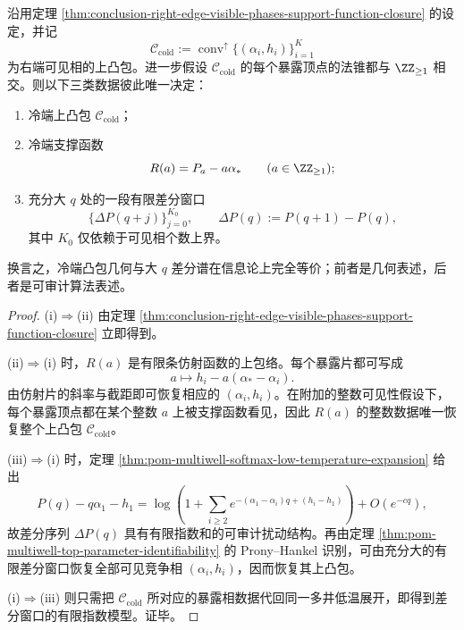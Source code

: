 \begin{theorem}\label{thm:conclusion-coldend-convex-hull-difference-window-prony-equivalence}
沿用定理 \ref{thm:conclusion-right-edge-visible-phases-support-function-closure} 的设定，并记
\[
\mathcal C_{\mathrm{cold}}
:=
\operatorname{conv}^{\uparrow}\{(\alpha_i,h_i)\}_{i=1}^{K}
\]
为右端可见相的上凸包。进一步假设 \(\mathcal C_{\mathrm{cold}}\) 的每个暴露顶点的法锥都与 \(\ZZ_{\ge1}\) 相交。则以下三类数据彼此唯一决定：
\begin{enumerate}
  \item 冷端上凸包 \(\mathcal C_{\mathrm{cold}}\)；
  \item 冷端支撑函数
  \[
  R(a)=P_a-a\alpha_\ast
  \qquad (a\in\ZZ_{\ge1});
  \]
  \item 充分大 \(q\) 处的一段有限差分窗口
  \[
  \bigl\{\Delta P(q+j)\bigr\}_{j=0}^{K_0},
  \qquad
  \Delta P(q):=P(q+1)-P(q),
  \]
  其中 \(K_0\) 仅依赖于可见相个数上界。
\end{enumerate}
换言之，冷端凸包几何与大 \(q\) 差分谱在信息论上完全等价；前者是几何表述，后者是可审计算法表述。
\end{theorem}
\begin{proof}
\textup{(i)\(\Rightarrow\)(ii)} 由定理 \ref{thm:conclusion-right-edge-visible-phases-support-function-closure} 立即得到。

\textup{(ii)\(\Rightarrow\)(i)} 时，\(R(a)\) 是有限条仿射函数的上包络。每个暴露片都可写成
\[
a\longmapsto h_i-a(\alpha_\ast-\alpha_i).
\]
由仿射片的斜率与截距即可恢复相应的 \((\alpha_i,h_i)\)。在附加的整数可见性假设下，每个暴露顶点都在某个整数 \(a\) 上被支撑函数看见，因此 \(R(a)\) 的整数数据唯一恢复整个上凸包 \(\mathcal C_{\mathrm{cold}}\)。

\textup{(iii)\(\Rightarrow\)(i)} 时，定理 \ref{thm:pom-multiwell-softmax-low-temperature-expansion} 给出
\[
P(q)-q\alpha_1-h_1
=
\log\!\left(
1+\sum_{i\ge2}e^{-(\alpha_1-\alpha_i)q+(h_i-h_1)}
\right)
+O(e^{-cq}),
\]
故差分序列 \(\Delta P(q)\) 具有有限指数和的可审计扰动结构。再由定理 \ref{thm:pom-multiwell-top-parameter-identifiability} 的 Prony--Hankel 识别，可由充分大的有限差分窗口恢复全部可见竞争相 \((\alpha_i,h_i)\)，因而恢复其上凸包。

\textup{(i)\(\Rightarrow\)(iii)} 则只需把 \(\mathcal C_{\mathrm{cold}}\) 所对应的暴露相数据代回同一多井低温展开，即得到差分窗口的有限指数模型。证毕。
\end{proof}


